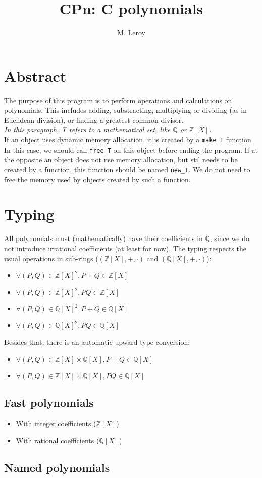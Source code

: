 \documentclass[en]{article}
\title{CPn: C polynomials}
\author{M. Leroy}
\begin{document}
\maketitle

\section{Abstract}

The purpose of this program is to perform operations and calculations on polynomials. This includes adding, substracting, multiplying or dividing (as in Euclidean division), or finding a greatest common divisor. \\

\textit{In this paragraph, T refers to a mathematical set, like $\mathbb{Q}$ or $\mathbb{Z}[X]$.} \\

If an object uses dynamic memory allocation, it is created by a \texttt{make\_T} function. In this case, we should call \texttt{free\_T} on this object before ending the program. If at the opposite an object does not use memory allocation, but stil needs to be created by a function, this function should be named \texttt{new\_T}. We do not need to free the memory used by objects created by such a function.

\section{Typing}

All polynomials must (mathematically) have their coefficients in $\mathbb{Q}$, since we do not introduce irrational coefficients (at least for now). The typing respects the usual operations in sub-rings ($(\mathbb{Z}[X], +, \cdot)$ and $(\mathbb{Q}[X], +, \cdot)$):
\begin{itemize}
    \item $\forall (P, Q) \in \mathbb{Z}[X]^2, P + Q \in \mathbb{Z}[X]$
    \item $\forall (P, Q) \in \mathbb{Z}[X]^2, PQ \in \mathbb{Z}[X]$
    \item $\forall (P, Q) \in \mathbb{Q}[X]^2, P + Q \in \mathbb{Q}[X]$
    \item $\forall (P, Q) \in \mathbb{Q}[X]^2, PQ \in \mathbb{Q}[X]$
\end{itemize}
Besides that, there is an automatic upward type conversion:
\begin{itemize}
    \item $\forall (P, Q) \in \mathbb{Z}[X] \times \mathbb{Q}[X], P + Q \in \mathbb{Q}[X]$
    \item $\forall (P, Q) \in \mathbb{Z}[X] \times \mathbb{Q}[X], PQ \in \mathbb{Q}[X]$
\end{itemize}

\subsection{Fast polynomials}

\begin{itemize}
    \item With integer coefficients ($\mathbb{Z}[X]$)
    \item With rational coefficients ($\mathbb{Q}[X]$)
\end{itemize}

\subsection{Named polynomials}
\end{document}
